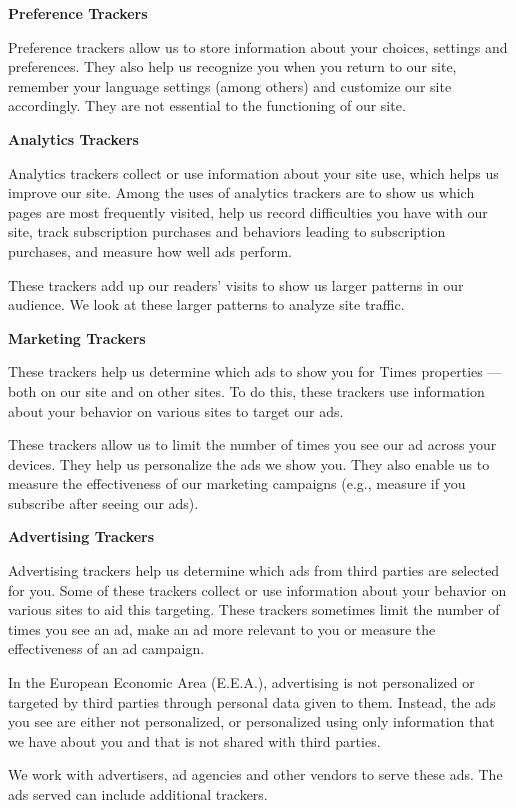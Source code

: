 \textbf{Preference Trackers}

Preference trackers allow us to store information about your choices,
settings and preferences. They also help us recognize you when you
return to our site, remember your language settings (among others) and
customize our site accordingly. They are not essential to the
functioning of our site.

\textbf{Analytics Trackers}

Analytics trackers collect or use information about your site use, which
helps us improve our site. Among the uses of analytics trackers are to
show us which pages are most frequently visited, help us record
difficulties you have with our site, track subscription purchases and
behaviors leading to subscription purchases, and measure how well ads
perform.

These trackers add up our readers' visits to show us larger patterns in
our audience. We look at these larger patterns to analyze site traffic.

\textbf{Marketing Trackers}

These trackers help us determine which ads to show you for Times
properties --- both on our site and on other sites. To do this, these
trackers use information about your behavior on various sites to target
our ads.

These trackers allow us to limit the number of times you see our ad
across your devices. They help us personalize the ads we show you. They
also enable us to measure the effectiveness of our marketing campaigns
(e.g., measure if you subscribe after seeing our ads).

\textbf{Advertising Trackers}

Advertising trackers help us determine which ads from third parties are
selected for you. Some of these trackers collect or use information
about your behavior on various sites to aid this targeting. These
trackers sometimes limit the number of times you see an ad, make an ad
more relevant to you or measure the effectiveness of an ad campaign.

In the European Economic Area (E.E.A.), advertising is not personalized
or targeted by third parties through personal data given to them.
Instead, the ads you see are either not personalized, or personalized
using only information that we have about you and that is not shared
with third parties.

We work with advertisers, ad agencies and other vendors to serve these
ads. The ads served can include additional trackers.

